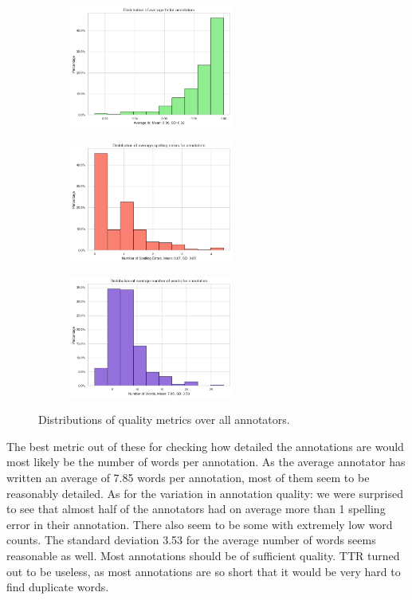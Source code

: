 \begin{figure}[htbp]
  \centering
  \begin{subfigure}[b]{0.33\textwidth}
    \includegraphics[width=\textwidth, height=4cm]{figs/ttr_dist.png}
  \end{subfigure}
  \hfill
  \begin{subfigure}[b]{0.33\textwidth}
    \includegraphics[width=\textwidth, height=4cm]{figs/error_dist.png}
  \end{subfigure}
  \hfill
  \begin{subfigure}[b]{0.33\textwidth}
    \includegraphics[width=\textwidth, height=4cm]{figs/word_dist.png}
  \end{subfigure}
  \caption{Distributions of quality metrics over all annotators.}
  \label{fig:2_d}
\end{figure}

The best metric out of these for checking how detailed the annotations are would most likely be the number of words per annotation. As the average annotator has written an average of 7.85 words per annotation, most of them seem to be reasonably detailed.
As for the variation in annotation quality: we were surprised to see that almost half of the annotators had on average more than 1 spelling error in their annotation. There also seem to be some with extremely low word counts. The standard deviation 3.53 for the average number of words seems reasonable as well. Most annotations should be of sufficient quality.
TTR turned out to be useless, as most annotations are so short that it would be very hard to find duplicate words.

